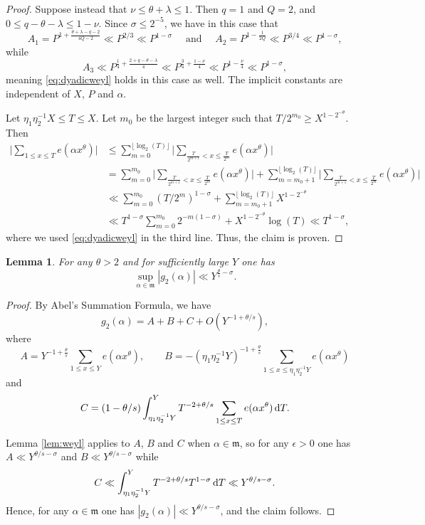 \documentclass[11pt,reqno]{amsart}
\numberwithin{equation}{section}
\newtheorem{lemma}{Lemma}[section]
\renewcommand{\d}{\,{\rm d}}
\begin{document}
\begin{proof}
Suppose instead that $\nu \leq \theta+\lambda \leq 1$. Then $q = 1$ and $Q = 2$, and $0 \leq q-\theta-\lambda \leq 1-\nu$. Since $\sigma \leq 2^{-5}$, we have in this case that 
\[ A_1 = P^{1+\frac{\theta+\lambda-q-2}{4Q-2}} \ll P^{2/3} \ll P^{1-\sigma} \quad \text{ and } \quad A_2 = P^{1-\frac{1}{2Q}} \ll P^{3/4} \ll P^{1-\sigma}, \]
while 
\[ A_3 \ll P^{\frac{1}{4}+\frac{2+q-\theta-\lambda}{4}} \ll P^{\frac{3}{4} +\frac{1-\nu}{4}} \ll P^{1-\frac{\nu}{4}} \ll P^{1-\sigma}, \]
meaning \eqref{eq:dyadicweyl} holds in this case as well. The implicit constants are independent of $X$, $P$ and $\alpha$. 

Let $\eta_1\eta_2^{-1}X \leq T \leq X$. Let $m_0$ be the largest integer such that $T/2^{m_0} \geq X^{1-2^{-\theta}}$. Then 
\begin{align*} \Big| \sum_{1 \leq x \leq T} e(\alpha x^{\theta}) \Big| & \leq \sum_{m = 0}^{\lfloor \log_2(T) \rfloor} \Big| \sum_{\frac{T}{2^{m+1}} < x \leq \frac{T}{2^m}} e(\alpha x^{\theta}) \Big| 
\\ & = \sum_{m=0}^{m_0} \Big| \sum_{\frac{T}{2^{m+1}} < x \leq \frac{T}{2^m}} e(\alpha x^{\theta}) \Big| + \sum_{m=m_0+1}^{\lfloor \log_2(T) \rfloor} \Big| \sum_{\frac{T}{2^{m+1}} < x \leq \frac{T}{2^m}} e(\alpha x^{\theta}) \Big| 
\\ & \ll \sum_{m=0}^{m_0} (T/2^m)^{1-\sigma} + \sum_{m=m_0+1}^{\lfloor \log_2(T) \rfloor} X^{1-2^{-\theta}} 
\\ & \ll T^{1-\sigma}\sum_{m=0}^{m_0} 2^{-m(1-\sigma)} + X^{1-2^{-\theta}}\log(T) \ll T^{1-\sigma},
\end{align*}
where we used \eqref{eq:dyadicweyl} in the third line. Thus, the claim is proven. 
\end{proof}
 

\begin{lemma} \label{lem:approxweightweyl}
For any $\theta > 2$ and for sufficiently large $Y$ one has 
\[ \sup_{\alpha \in \mathfrak{m}} |g_2(\alpha) | \ll Y^{\frac{\theta}{s}-\sigma}. \]
\end{lemma}


\begin{proof} By Abel's Summation Formula, we have 
\[ g_2(\alpha) = A+B+C+O(Y^{-1+\theta/s}), \]
where 
\[ A = Y^{-1+\frac{\theta}{s}}\sum_{1 \leq x \leq Y}e(\alpha x^{\theta}), \quad \quad B = - (\eta_1\eta_2^{-1}Y)^{-1+\frac{\theta}{s}} \sum_{1 \leq x \leq \eta_1\eta_2^{-1}Y} e(\alpha x^{\theta})\]
and 
\[ C = (1-\theta/s)\int_{\eta_1\eta_2^{-1}Y}^Y T^{-2+\theta/s}\sum_{1 \leq x \leq T} e(\alpha x^{\theta}) \d T. \]

Lemma \ref{lem:weyl} applies to $A$, $B$ and $C$ when $\alpha \in \mathfrak{m}$, so for any $\epsilon > 0$ one has $A \ll Y^{\theta/s-\sigma}$ and $B \ll Y^{\theta/s-\sigma}$ while 
\[ C \ll \int_{\eta_1\eta_2^{-1}Y}^Y T^{-2+\theta/s}T^{1-\sigma}\d T \ll Y^{\theta/s-\sigma}. \]
Hence, for any $\alpha \in \mathfrak{m}$ one has $|g_2(\alpha)| \ll Y^{\theta/s-\sigma}$, and the claim follows. 
\end{proof}
\end{document}
